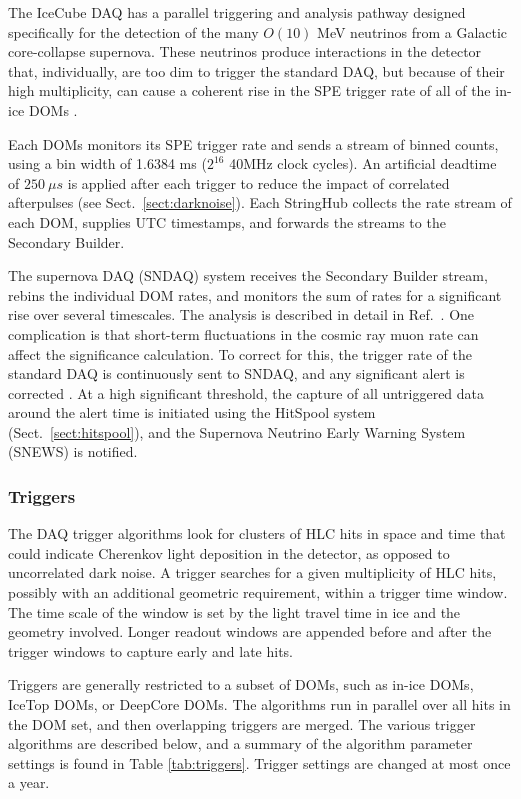 The IceCube DAQ has a parallel triggering and analysis pathway designed
specifically for the detection of the many $O(10)$ MeV neutrinos from a Galactic
core-collapse supernova.  These neutrinos produce interactions in the
detector that, individually, are too dim to trigger the standard DAQ, but because of their
high multiplicity, can cause a coherent rise in the SPE trigger rate of all
of the in-ice DOMs \cite{IC3:supernova}. 

Each DOMs monitors its SPE trigger rate and sends a stream of binned
counts, using a bin width of 1.6384 ms ($2^{16}$ 40MHz clock cycles).  An
artificial deadtime of $250\ {\mu}s$ is applied after each trigger to
reduce the impact of correlated afterpulses (see
Sect.~\ref{sect:darknoise}).  Each StringHub
collects the rate stream of each DOM, supplies UTC timestamps, and
forwards the streams to the Secondary Builder.  

The supernova DAQ (SNDAQ) system receives the Secondary Builder stream,
rebins the individual DOM rates, and monitors the sum of rates for a
significant rise over several timescales.  The analysis is described in
detail in Ref.~\cite{IC3:supernova}.  One complication is that short-term
fluctuations in the cosmic ray muon rate can affect the significance
calculation.  To correct for this, the trigger rate of the standard DAQ is
continuously sent to SNDAQ, and any significant alert is corrected
\cite{IC3:icrc15_sndaq}.  At a 
high significant threshold, the capture of all untriggered data around the
alert time is initiated using the HitSpool system
(Sect.~\ref{sect:hitspool}), and the Supernova Neutrino Early Warning
System (SNEWS) \cite{SNEWS} is notified.

\subsubsection{\label{sect:online:trigger}Triggers}

The DAQ trigger algorithms look for clusters of HLC hits in space and time
that could indicate Cherenkov light deposition in the detector, as opposed
to uncorrelated dark noise.  A trigger searches for a given multiplicity of
HLC hits, possibly with an additional geometric requirement, within a
trigger time window.  The time scale of the window is set by the light
travel time in ice and the geometry involved. Longer readout windows 
are appended before and after the trigger windows to capture early and late
hits.

Triggers are generally restricted to a subset of DOMs, such as in-ice DOMs,
IceTop DOMs, or DeepCore DOMs.  The algorithms run in parallel over all
hits in the DOM set, and then overlapping triggers are merged.   The
various trigger algorithms are described below, and a summary of the
algorithm parameter settings is found in Table \ref{tab:triggers}.  Trigger
settings are changed at most once a year.

